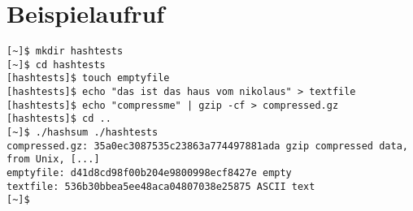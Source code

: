 \documentclass{article}
\begin{document}
\section*{Beispielaufruf}
\begin{verbatim}
[~]$ mkdir hashtests
[~]$ cd hashtests
[hashtests]$ touch emptyfile
[hashtests]$ echo "das ist das haus vom nikolaus" > textfile
[hashtests]$ echo "compressme" | gzip -cf > compressed.gz
[hashtests]$ cd ..
[~]$ ./hashsum ./hashtests
compressed.gz: 35a0ec3087535c23863a774497881ada gzip compressed data, from Unix, [...]
emptyfile: d41d8cd98f00b204e9800998ecf8427e empty
textfile: 536b30bbea5ee48aca04807038e25875 ASCII text
[~]$
\end{verbatim}
\end{document}
